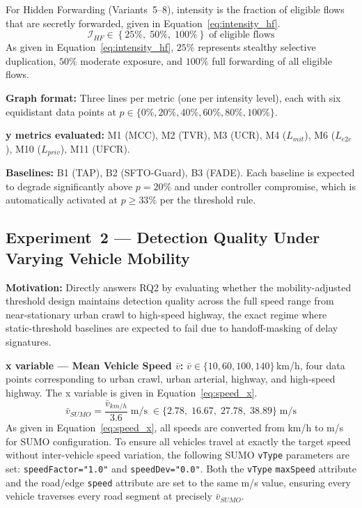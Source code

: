 \documentclass[12pt, a4paper]{report}
\begin{document}
{{For Hidden Forwarding (Variants~5--8), intensity is
the fraction of eligible flows that are secretly
forwarded, given in Equation~\eqref{eq:intensity_hf}.
\begin{equation}
\mathcal{I}_{HF} \in
\left\{25\%,\; 50\%,\; 100\%\right\}
\;\text{of eligible flows}
\label{eq:intensity_hf}
\end{equation}
As given in Equation~\eqref{eq:intensity_hf},
$25\%$ represents stealthy selective duplication,
$50\%$ moderate exposure, and $100\%$ full
forwarding of all eligible flows.

\textbf{Graph format:} Three lines per metric (one
per intensity level), each with six equidistant
data points at $p \in \{0\%, 20\%, 40\%, 60\%,
80\%, 100\%\}$.

\textbf{y metrics evaluated:}
M1 (MCC), M2 (TVR), M3 (UCR), M4 ($L_{mit}$),
M6 ($L_{e2e}$), M10 ($L_{priv}$), M11 (UFCR).

\textbf{Baselines:} B1 (TAP), B2 (SFTO-Guard),
B3 (FADE). Each baseline is expected to degrade
significantly above $p = 20\%$ and under controller
compromise, which is automatically activated at
$p \geq 33\%$ per the threshold rule.



\subsection{Experiment~2 — Detection Quality Under
Varying Vehicle Mobility}
\label{sec:exp2}

\textbf{Motivation:} Directly answers RQ2 by
evaluating whether the mobility-adjusted threshold
design maintains detection quality across the full
speed range from near-stationary urban crawl to
high-speed highway, the exact regime where
static-threshold baselines are expected to fail
due to handoff-masking of delay signatures.

\textbf{x variable — Mean Vehicle Speed $\bar{v}$:}
$\bar{v} \in \{10, 60, 100, 140\}$\,km/h,
four data points corresponding to urban crawl,
urban arterial, highway, and high-speed highway.
The x variable is given in
Equation~\eqref{eq:speed_x}.
\begin{equation}
\bar{v}_{SUMO} = \frac{\bar{v}_{km/h}}{3.6}
\;\text{m/s} \;\in
\{2.78,\; 16.67,\; 27.78,\; 38.89\}\;\text{m/s}
\label{eq:speed_x}
\end{equation}
As given in Equation~\eqref{eq:speed_x}, all speeds
are converted from km/h to m/s for \ac{SUMO}
configuration. To ensure all vehicles travel at
exactly the target speed without inter-vehicle speed
variation, the following \ac{SUMO} \texttt{vType}
parameters are set: \texttt{speedFactor="1.0"} and
\texttt{speedDev="0.0"}. Both the \texttt{vType}
\texttt{maxSpeed} attribute and the road/edge
\texttt{speed} attribute are set to the same m/s
value, ensuring every vehicle traverses every road
segment at precisely $\bar{v}_{SUMO}$.

}}
\end{document}
